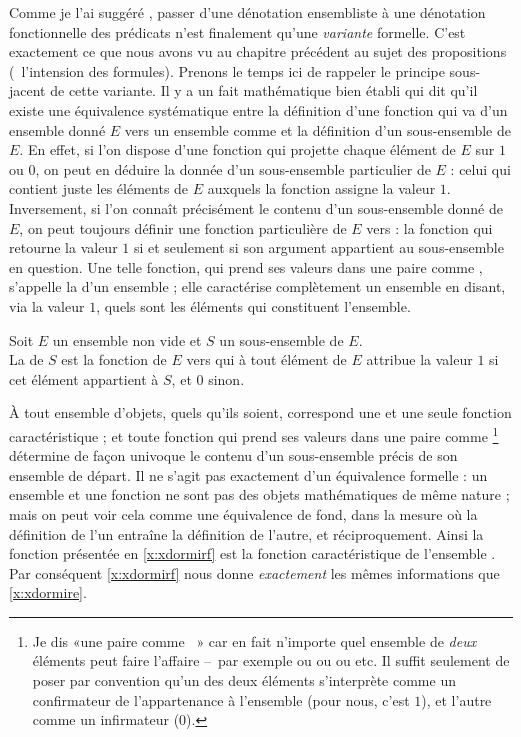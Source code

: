 Comme je l'ai suggéré , passer d'une dénotation
ensembliste à une dénotation fonctionnelle des prédicats n'est 
finalement
qu'une \emph{variante} formelle. %
C'est exactement  ce que nous avons vu au chapitre précédent au sujet des propositions (\ie\ l'intension des formules).
Prenons le temps ici de rappeler le principe sous-jacent de cette variante.
Il y a un fait mathématique bien établi qui dit qu'il existe  
une équivalence  systématique entre la définition d'une fonction qui va d'un
ensemble donné $E$ vers un ensemble comme  et la définition
d'un sous-ensemble de $E$. 
En effet, si l'on dispose d'une fonction qui projette chaque élément
de $E$ sur $1$ ou $0$, on peut en déduire la donnée d'un sous-ensemble
particulier de $E$ : celui qui contient juste les éléments de $E$
auxquels la fonction assigne la valeur $1$.  Inversement, si l'on
connaît précisément le contenu d'un sous-ensemble donné de $E$, on
peut toujours définir une fonction particulière de $E$ vers 
 : la fonction qui retourne 
la valeur $1$ si et seulement si son argument appartient au
sous-ensemble en question. 
Une telle fonction, qui prend ses valeurs dans une paire comme
,  s'appelle la 
 d'un ensemble ; elle caractérise
complètement un ensemble en disant, via la valeur $1$, quels sont les
éléments qui constituent l'ensemble.


\begin{defi}
Soit $E$ un ensemble non vide et $S$ un sous-ensemble  de $E$.
\\
La  de  $S$ %
est la fonction de $E$ vers
 qui à tout élément de $E$ attribue la valeur $1$ si cet
élément appartient à $S$, et $0$ sinon.
\end{defi}


À tout ensemble d'objets, quels qu'ils soient, correspond une et une
seule fonction caractéristique ; et toute fonction qui prend ses
valeurs dans une paire comme %
\footnote{Je dis «une paire comme ~» car en fait
  n'importe quel ensemble de \emph{deux} éléments peut faire l'affaire --~par
exemple \set{+;-} ou  ou \set{\bullet;\circ} ou
\set{\smiley;\frownie} etc. Il suffit seulement de poser par convention qu'un
des deux éléments s'interprète comme un confirmateur de l'appartenance
à l'ensemble (pour nous, c'est $1$), et l'autre comme un infirmateur ($0$).}
 détermine de façon univoque le
contenu d'un sous-ensemble précis de son ensemble de départ. 
Il ne s'agit pas exactement d'un équivalence formelle : un ensemble et
une fonction ne sont pas des objets mathématiques de même nature ;
mais on peut voir cela comme une équivalence de fond, dans la mesure
où la définition de l'un entraîne la définition de l'autre, et
réciproquement. 
Ainsi la fonction présentée en \ref{x:xdormirf} est la fonction
caractéristique de l'ensemble . 
Par conséquent \ref{x:xdormirf} nous donne \emph{exactement} les mêmes
informations que \ref{x:xdormire}.

